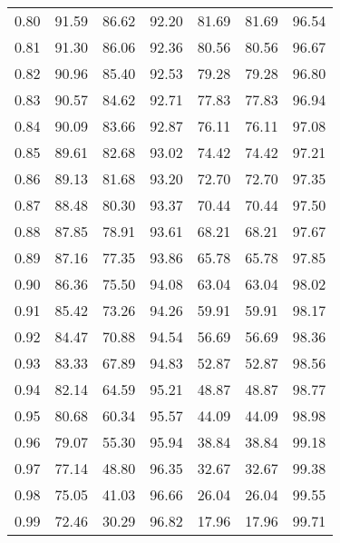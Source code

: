 \begin{tabular}{|c|c|c|c|c|c|c|}
      0.80 &     91.59 &     86.62 &      92.20 &   81.69 &      81.69 &         96.54 \\
      0.81 &     91.30 &     86.06 &      92.36 &   80.56 &      80.56 &         96.67 \\
      0.82 &     90.96 &     85.40 &      92.53 &   79.28 &      79.28 &         96.80 \\
      0.83 &     90.57 &     84.62 &      92.71 &   77.83 &      77.83 &         96.94 \\
      0.84 &     90.09 &     83.66 &      92.87 &   76.11 &      76.11 &         97.08 \\
      0.85 &     89.61 &     82.68 &      93.02 &   74.42 &      74.42 &         97.21 \\
      0.86 &     89.13 &     81.68 &      93.20 &   72.70 &      72.70 &         97.35 \\
      0.87 &     88.48 &     80.30 &      93.37 &   70.44 &      70.44 &         97.50 \\
      0.88 &     87.85 &     78.91 &      93.61 &   68.21 &      68.21 &         97.67 \\
      0.89 &     87.16 &     77.35 &      93.86 &   65.78 &      65.78 &         97.85 \\
      0.90 &     86.36 &     75.50 &      94.08 &   63.04 &      63.04 &         98.02 \\
      0.91 &     85.42 &     73.26 &      94.26 &   59.91 &      59.91 &         98.17 \\
      0.92 &     84.47 &     70.88 &      94.54 &   56.69 &      56.69 &         98.36 \\
      0.93 &     83.33 &     67.89 &      94.83 &   52.87 &      52.87 &         98.56 \\
      0.94 &     82.14 &     64.59 &      95.21 &   48.87 &      48.87 &         98.77 \\
      0.95 &     80.68 &     60.34 &      95.57 &   44.09 &      44.09 &         98.98 \\
      0.96 &     79.07 &     55.30 &      95.94 &   38.84 &      38.84 &         99.18 \\
      0.97 &     77.14 &     48.80 &      96.35 &   32.67 &      32.67 &         99.38 \\
      0.98 &     75.05 &     41.03 &      96.66 &   26.04 &      26.04 &         99.55 \\
      0.99 &     72.46 &     30.29 &      96.82 &   17.96 &      17.96 &         99.71 \\
\bottomrule
\end{tabular}
